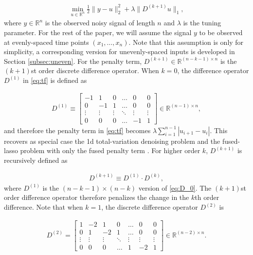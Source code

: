 \documentclass[a4paper]{article}
\newcommand{\RR}{\mathbb{R}}
\begin{document}
\begin{align}
\min_{u\in\RR^n} \frac{1}{2}\|y-u\|_2^2 + \lambda\|D^{(k+1)}u\|_1,  
\label{eq:tf}
\end{align}
where $y\in\RR^n$ is the observed noisy signal of length $n$ and $\lambda$ is the tuning parameter. For the rest of the paper, we will assume the signal $y$ to be observed at evenly-spaced time points $(x_1,\ldots, x_n)$. Note that this assumption is only for simplicity, a corresponding version for unevenly-spaced inputs is developed in Section \ref{subsec:uneven}. For the penalty term, $D^{(k+1)}\in\RR^{(n-k-1)\times n}$ is the $(k+1)$st order discrete difference operator. When $k = 0$, the difference operator $D^{(1)}$ in \eqref{eq:tf} is defined as

\begin{align}
D^{(1)} \equiv
\begin{bmatrix}
-1 & 1 & 0 & \ldots & 0 & 0\\
0 & -1 & 1 & \ldots & 0 & 0\\
\vdots & \vdots & \vdots & \ddots & \vdots & \vdots\\
0 & 0 & 0 & \ldots & -1 & 1
\end{bmatrix}\in\RR^{(n-1) \times n},
\label{eq:D_0}
\end{align}
and therefore the penalty term in \eqref{eq:tf} becomes $\lambda\sum_{i=1}^{n-1}|u_{i+1}- u_i|$. This recovers as special case the 1d total-variation denoising problem \cite{rudin1992nonlinear,harchaoui2010multiple} and the fused-lasso problem with only the fused penalty term \cite{tibshirani2005sparsity}. For higher order $k$, $D^{(k+1)}$ is recursively defined as

\begin{align}
D^{(k+1)} \equiv D^{(1)} \cdot D^{(k)}, 
\label{eq:difference_op}
\end{align}
where $D^{(1)}$ is the $(n-k-1)\times (n-k)$ version of \eqref{eq:D_0}. The $(k+1)$st order difference operator therefore penalizes the change in the $k$th order difference. Note that when $k = 1$, the discrete difference operator $D^{(2)}$ is


\begin{align*}
D^{(2)} =
\begin{bmatrix}
1 & -2 & 1 & 0 & \ldots & 0 & 0\\
0 & 1 & -2 & 1 & \ldots & 0 & 0\\
\vdots & \vdots & \vdots & \ddots & \vdots & \vdots & \vdots\\
0 & 0 & 0 & \ldots & 1 & -2 & 1
\end{bmatrix}\in\RR^{(n-2) \times n}.
\end{align*}
\end{document}
